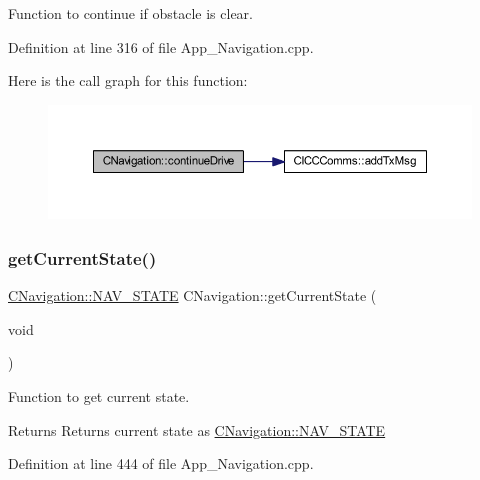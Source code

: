 Function to continue if obstacle is clear. 



Definition at line 316 of file App\+\_\+\+Navigation.\+cpp.

Here is the call graph for this function\+:\nopagebreak
\begin{figure}[H]
\begin{center}
\leavevmode
\includegraphics[width=350pt]{class_c_navigation_ab3d29f3ab4a8a922f5af439f6d78aded_cgraph}
\end{center}
\end{figure}
\mbox{\label{class_c_navigation_a42982842952ac5340b54f43a661673f4}} 
\subsubsection{\texorpdfstring{get\+Current\+State()}{getCurrentState()}}
{\footnotesize\ttfamily \mbox{\hyperlink{class_c_navigation_add9fc966c7604990edf5c2a2e0eba32c}{C\+Navigation\+::\+N\+A\+V\+\_\+\+S\+T\+A\+TE}} C\+Navigation\+::get\+Current\+State (\begin{DoxyParamCaption}\item[{void}]{ }\end{DoxyParamCaption})\hspace{0.3cm}{\ttfamily [virtual]}}



Function to get current state. 

\begin{DoxyReturn}{Returns}
Returns current state as \mbox{\hyperlink{class_c_navigation_add9fc966c7604990edf5c2a2e0eba32c}{C\+Navigation\+::\+N\+A\+V\+\_\+\+S\+T\+A\+TE}} 
\end{DoxyReturn}


Definition at line 444 of file App\+\_\+\+Navigation.\+cpp.

\mbox{\label{class_c_navigation_afef253f37646558a755d956ecf2fc6e9}} 
